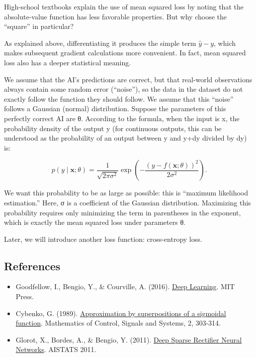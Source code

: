 High-school textbooks explain the use of mean squared loss by noting that the absolute-value function has less favorable properties. But why choose the ``square'' in particular?

As explained above, differentiating it produces the simple term \(\hat{y}-y\), which makes subsequent gradient calculations more convenient. In fact, mean squared loss also has a deeper statistical meaning.

We assume that the AI's predictions are correct, but that real-world observations always contain some random error (``noise''), so the data in the dataset do not exactly follow the function they should follow. We assume that this ``noise'' follows a Gaussian (normal) distribution. Suppose the parameters of this perfectly correct AI are θ. According to the formula, when the input is x, the probability density of the output y (for continuous outputs, this can be understood as the probability of an output between y and y+dy divided by dy) is:

\[
p(y \mid \mathbf{x};\theta)=\frac{1}{\sqrt{2\pi\sigma^2}}\exp\left(-\frac{(y-f(\mathbf{x};\theta))^2}{2\sigma^2}\right).
\]

We want this probability to be as large as possible: this is ``maximum likelihood estimation.'' Here, σ is a coefficient of the Gaussian distribution. Maximizing this probability requires only minimizing the term in parentheses in the exponent, which is exactly the mean squared loss under parameters θ.

Later, we will introduce another loss function: cross-entropy loss.

\FloatBarrier
{}
\hypertarget{references-1}{%
\subsection{References}\label{references-1}}

\vspace{0.25em}
\begin{itemize}
\tightlist
\item
  Goodfellow, I., Bengio, Y., \& Courville, A. (2016). \href{https://www.deeplearningbook.org/}{Deep Learning}. MIT Press.
\item
  Cybenko, G. (1989). \href{https://doi.org/10.1007/BF02551274}{Approximation by superpositions of a sigmoidal function}. Mathematics of Control, Signals and Systems, 2, 303-314.
\item
  Glorot, X., Bordes, A., \& Bengio, Y. (2011). \href{https://proceedings.mlr.press/v15/glorot11a.html}{Deep Sparse Rectifier Neural Networks}. AISTATS 2011.
\end{itemize}

\clearpage
